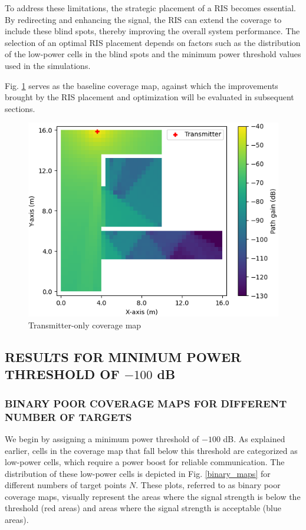 \documentclass{IEEEoj}
\begin{document}
To address these limitations, the strategic placement of a RIS becomes essential. By redirecting and enhancing the signal, the RIS can extend the coverage to include these blind spots, thereby improving the overall system performance. The selection of an optimal RIS placement depends on factors such as the distribution of the low-power cells in the blind spots and the minimum power threshold values used in the simulations.

Fig. \ref{TX_coverage_map} serves as the baseline coverage map, against which the improvements brought by the RIS placement and optimization will be evaluated in subsequent sections.

\begin{figure}
	\centering \includegraphics[width=\linewidth]{Sim_Results/TX_coverage_map.png}
	\caption{Transmitter-only coverage map}
	\label{TX_coverage_map}
\end{figure}

\subsection{RESULTS FOR MINIMUM POWER THRESHOLD OF $-100$ dB}

\subsubsection{BINARY POOR COVERAGE MAPS FOR DIFFERENT NUMBER OF TARGETS}
We begin by assigning a minimum power threshold of $-100$ dB. As explained earlier, cells in the coverage map that fall below this threshold are categorized as low-power cells, which require a power boost for reliable communication. The distribution of these low-power cells is depicted in Fig. \ref{binary_maps} for different numbers of target points $N$. These plots, referred to as binary poor coverage maps, visually represent the areas where the signal strength is below the threshold (red areas) and areas where the signal strength is acceptable (blue areas).
\end{document}
